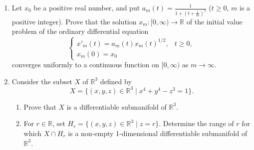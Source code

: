 \documentclass[10pt,a4paper]{article}
\begin{document}
\begin{enumerate}[label=\fbox{\arabic*}]
  \item %
        Let $x_0$ be a positive real number, and put $a_m(t) = \frac{1}{1 + (t + \frac{1}{m})^2}$ ($t \ge 0$, $m$ is a positive integer). Prove that the solution $x_m : [0, \infty) \to \mathbb{R}$ of the initial value problem of the ordinary differential equation
        \[
          \begin{cases} x'_m(t) = a_m(t) x_m(t)^{1/2}, & t \ge 0, \\ x_m(0) = x_0 \end{cases}
        \]
        converges uniformly to a continuous function on $[0, \infty)$ as $m \to \infty$.

  \item %
        Consider the subset $X$ of $\mathbb{R}^3$ defined by
        \[
          X = \{ (x, y, z) \in \mathbb{R}^3 \mid x^4 + y^4 - z^3 = 1 \}.
        \]
        \begin{enumerate}[label=(\arabic*)]
          \item Prove that $X$ is a differentiable submanifold of $\mathbb{R}^3$.
          \item For $r \in \mathbb{R}$, set $H_r = \{ (x, y, z) \in \mathbb{R}^3 \mid z = r \}$. Determine the range of $r$ for which $X \cap H_r$ is a non-empty 1-dimensional differentiable submanifold of $\mathbb{R}^3$.
        \end{enumerate}
\end{enumerate}

\newpage
\end{document}
